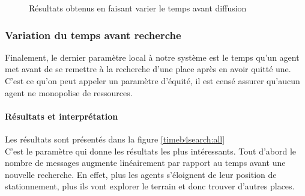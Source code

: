 \begin{figure}
\begin{center}
  \end{center}

  \caption{Résultats obtenus en faisant varier le temps avant diffusion}
  \label{timeb4broad:all}
\end{figure}

\subsubsection{Variation du temps avant recherche}

Finalement, le dernier paramètre local à notre système est le temps qu'un agent met avant de se remettre à la recherche d'une place après en avoir quitté une. C'est ce qu'on peut appeler un paramètre d'équité, il est censé assurer qu'aucun agent ne monopolise de ressources.

\paragraph{Résultats et interprétation}

Les résultats sont présentés dans la figure \ref{timeb4search:all}\\

C'est le paramètre qui donne les résultats les plus intéressants. Tout d'abord le nombre de messages augmente linéairement par rapport au temps avant une nouvelle recherche. En effet, plus les agents s'éloignent de leur position de stationnement, plus ils vont explorer le terrain et donc trouver d'autres places.\\

